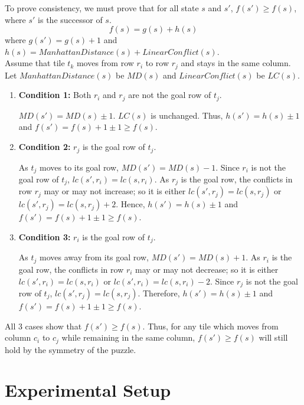 \documentclass[runningheads]{llncs}
\begin{document}
    To prove consistency, we must prove that for all state \( s \) and \( s' \), \( f(s') \geq f(s) \), where \( s' \) is the successor of \( s \).
\[
    f(s) = g(s) + h(s)
\]
where $g(s') = g(s) + 1$ and $h(s) = ManhattanDistance(s) + LinearConflict(s)$. \\
Assume that tile \( t_k \) moves from row \( r_i \) to row \( r_j \) and stays in the same column. Let \( ManhattanDistance(s) \) be \( MD(s) \) and \( LinearConflict(s) \) be \( LC(s) \). 
\begin{enumerate}
    \item \textbf{Condition 1:} Both \( r_i \) and \( r_j \) are not the goal row of \( t_j \).
    
        \( MD(s') = MD(s) \pm 1 \). \( LC(s) \) is unchanged. Thus, \( h(s') = h(s) \pm 1 \) and \( f(s') = f(s) + 1 \pm 1 \geq f(s) \).
    
    \item \textbf{Condition 2:} \( r_j \) is the goal row of \( t_j \).
        
        As \( t_j \) moves to its goal row, \( MD(s') = MD(s) - 1 \). Since \( r_i \) is not the goal row of \( t_j \), \( lc(s', r_i) = lc(s, r_i) \). 
        As \( r_j \) is the goal row, the conflicts in row \( r_j \) may or may not increase; so it is either \( lc(s', r_j) = lc(s, r_j) \) or \( lc(s', r_j) = lc(s, r_j) + 2 \). 
        Hence, \( h(s') = h(s) \pm 1 \) and \( f(s') = f(s) + 1 \pm 1 \geq f(s) \).

    \item \textbf{Condition 3:} \( r_i \) is the goal row of \( t_j \).
    
        As \( t_j \) moves away from its goal row, \( MD(s') = MD(s) + 1 \). 
        As \( r_i \) is the goal row, the conflicts in row \( r_i \) may or may not decrease; so it is either \( lc(s', r_i) = lc(s, r_i) \) or \( lc(s', r_i) = lc(s, r_i) - 2 \). 
        Since \( r_j \) is not the goal row of \( t_j \), \( lc(s', r_j) = lc(s, r_j) \). 
        Therefore, \( h(s') = h(s) \pm 1 \) and \( f(s') = f(s) + 1 \pm 1 \geq f(s) \).
\end{enumerate}
All 3 cases show that \( f(s') \geq f(s) \). Thus, for any tile which moves from column \( c_i \) to \( c_j \) while remaining in the same column, \( f(s') \geq f(s) \) will still hold by the symmetry of the puzzle.

\section{Experimental Setup}
\end{document}
